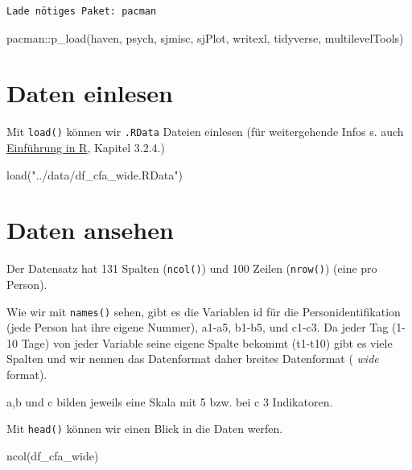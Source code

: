 \documentclass[
  letterpaper,
  DIV=11,
  numbers=noendperiod]{scrreprt}
\newenvironment{Shaded}{\begin{snugshade}}{\end{snugshade}}
\newcommand{\FunctionTok}[1]{\textcolor[rgb]{0.28,0.35,0.67}{#1}}
\newcommand{\NormalTok}[1]{\textcolor[rgb]{0.00,0.23,0.31}{#1}}
\newcommand{\SpecialCharTok}[1]{\textcolor[rgb]{0.37,0.37,0.37}{#1}}
\newcommand{\StringTok}[1]{\textcolor[rgb]{0.13,0.47,0.30}{#1}}
\begin{document}
\begin{verbatim}
Lade nötiges Paket: pacman
\end{verbatim}

\begin{Shaded}
\begin{Highlighting}[]
\NormalTok{pacman}\SpecialCharTok{::}\FunctionTok{p\_load}\NormalTok{(haven, psych,}
\NormalTok{               sjmisc, sjPlot, writexl,}
\NormalTok{               tidyverse, multilevelTools)}
\end{Highlighting}
\end{Shaded}

\section{Daten einlesen}\label{daten-einlesen}

Mit \texttt{load()} können wir \texttt{.RData} Dateien einlesen (für
weitergehende Infos s. auch
\href{https://methodenlehre.github.io/einfuehrung-in-R/chapters/03-data_frames.html}{Einführung
in R}, Kapitel 3.2.4.)

\begin{Shaded}
\begin{Highlighting}[]
\FunctionTok{load}\NormalTok{(}\StringTok{"../data/df\_cfa\_wide.RData"}\NormalTok{)}
\end{Highlighting}
\end{Shaded}

\section{Daten ansehen}\label{daten-ansehen}

Der Datensatz hat 131 Spalten (\texttt{ncol()}) und 100 Zeilen
(\texttt{nrow()}) (eine pro Person).

Wie wir mit \texttt{names()} sehen, gibt es die Variablen id für die
Personidentifikation (jede Person hat ihre eigene Nummer), a1-a5, b1-b5,
und c1-c3. Da jeder Tag (1-10 Tage) von jeder Variable seine eigene
Spalte bekommt (t1-t10) gibt es viele Spalten und wir nennen das
Datenformat daher breites Datenformat ( \emph{wide} format).

a,b und c bilden jeweils eine Skala mit 5 bzw. bei c 3 Indikatoren.

Mit \texttt{head()} können wir einen Blick in die Daten werfen.

\begin{Shaded}
\begin{Highlighting}[]
\FunctionTok{ncol}\NormalTok{(df\_cfa\_wide)}
\end{Highlighting}
\end{Shaded}
\end{document}
